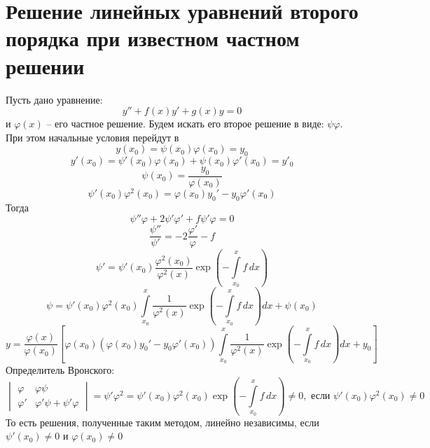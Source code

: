 \section{Решение линейных уравнений второго порядка при известном частном решении}

Пусть дано уравнение:
\[
	y'' + f(x) y' + g(x) y = 0
\]
и $\varphi(x)$ -- его частное решение. Будем искать его второе решение в виде: $\psi \varphi$. При этом начальные условия перейдут в
\[
	y(x_0) = \psi (x_0)\varphi(x_0) = y_0
\] 
\[
	y'(x_0) = \psi' (x_0) \varphi (x_0) + \psi (x_0) \varphi' (x_0) = y'_0
\]
\[
	\psi (x_0) = \frac{y_0}{\varphi(x_0)}
\]
\[
	\psi' (x_0) \varphi^2 (x_0) = \varphi (x_0) y_0' - y_0 \varphi' (x_0)
\]
Тогда
\[
	\psi'' \varphi + 2 \psi' \varphi' + f \psi' \varphi = 0
\]
\[
	\frac{\psi''}{\psi'} = - 2 \frac{\varphi'}{\varphi} - f
\]
\[
	\psi' = \psi'(x_0) \frac{\varphi^2(x_0)}{\varphi^2(x)} \exp \left( - \int\limits_{x_0}^{x} f\,dx\right)
\]
\[
	\psi = \psi' (x_0) \varphi^2 (x_0) \int\limits_{x_0}^{x} \frac{1}{\varphi^2(x)} \exp \left( - \int\limits_{x_0}^{x} f\,dx\right) dx + \psi (x_0)
\]
\[
	y = \frac{\varphi(x)}{\varphi(x_0)} \left[\varphi (x_0) ( \varphi (x_0) y_0' - y_0 \varphi' (x_0)) \int\limits_{x_0}^{x} \frac{1}{\varphi^2(x)} \exp \left( - \int\limits_{x_0}^{x} f\,dx\right) dx + y_0 \right]
\]
Определитель Вронского:
\[
	\begin{vmatrix}
		\varphi & \varphi \psi \\
		\varphi' & \varphi' \psi + \psi' \varphi
	\end{vmatrix} = \psi' \varphi^2 = 
	\psi'(x_0) \varphi^2(x_0) \exp \left( - \int\limits_{x_0}^{x} f\,dx\right) \ne 0, \text{ если } \psi'(x_0) \varphi^2(x_0) \ne 0
\]
То есть решения, полученные таким методом, линейно независимы, если $\psi'(x_0)\ne 0$ и $\varphi(x_0) \ne 0$